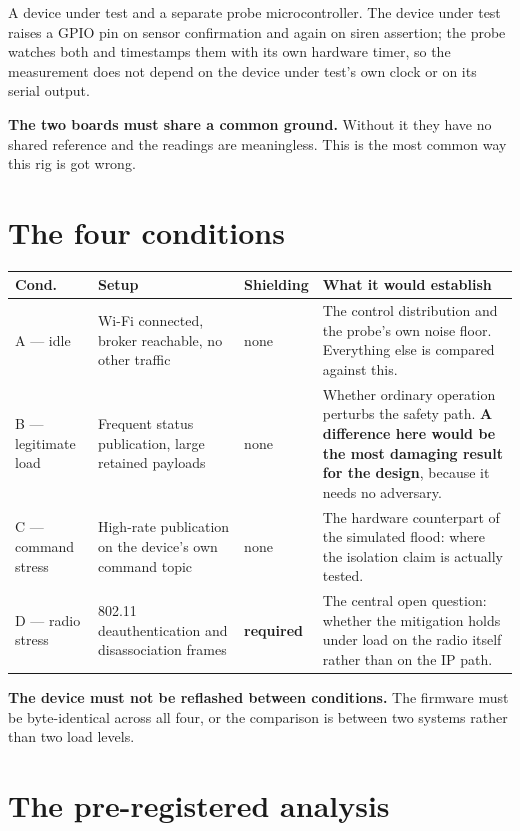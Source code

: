 A device under test and a separate probe microcontroller. The device under test raises a GPIO pin
on sensor confirmation and again on siren assertion; the probe watches both and timestamps them
with its own hardware timer, so the measurement does not depend on the device under test's own
clock or on its serial output.

\textbf{The two boards must share a common ground.} Without it they have no shared reference and
the readings are meaningless. This is the most common way this rig is got wrong.

\section{The four conditions}

\begin{longtable}{@{}p{}p{}p{}p{}@{}}
\toprule
\textbf{Cond.} & \textbf{Setup} & \textbf{Shielding} & \textbf{What it would establish} \\
\midrule
\endhead
A --- idle & Wi-Fi connected, broker reachable, no other traffic & none & The control
distribution and the probe's own noise floor. Everything else is compared against this. \\
B --- legitimate load & Frequent status publication, large retained payloads & none & Whether
ordinary operation perturbs the safety path. \textbf{A difference here would be the most damaging
result for the design}, because it needs no adversary. \\
C --- command stress & High-rate publication on the device's own command topic & none & The
hardware counterpart of the simulated flood: where the isolation claim is actually tested. \\
D --- radio stress & 802.11 deauthentication and disassociation frames & \textbf{required} &
The central open question: whether the mitigation holds under load on the radio itself rather
than on the IP path. \\
\bottomrule
\end{longtable}

\textbf{The device must not be reflashed between conditions.} The firmware must be byte-identical
across all four, or the comparison is between two systems rather than two load levels.

\section{The pre-registered analysis}

